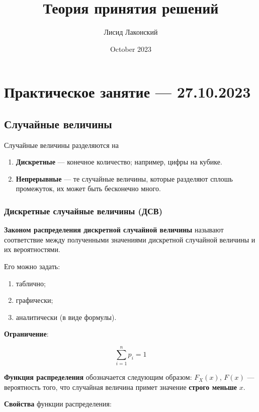 \documentclass{article}
\title{Теория принятия решений}
\author{Лисид Лаконский}
\date{October 2023}
\begin{document}
\raggedright

\maketitle

\tableofcontents
\pagebreak

\section{Практическое занятие — 27.10.2023}

\subsection{Случайные величины}

Случайные величины разделяются на

\begin{enumerate}
    \item \textbf{Дискретные} — конечное количество; например, цифры на кубике.
    \item \textbf{Непрерывные} — те случайные величины, которые разделяют сплошь промежуток, их может быть бесконечно много.
\end{enumerate}

\subsubsection{Дискретные случайные величины (ДСВ)}

\textbf{Законом распределения дискретной случайной величины} называют соответствие между полученными значениями дискретной случайной величины и их вероятностями.

Его можно задать:

\begin{enumerate}
    \item таблично;
    \item графически;
    \item аналитически (в виде формулы).
\end{enumerate}

\textbf{Ограничение}:

$$
\sum\limits_{i = 1}^{n} p_{i} = 1
$$

\textbf{Функция распределения} обозначается следующим образом: $F_{X}(x)$, $F(x)$ — вероятность того, что случайная величина примет значение \textbf{строго меньше} $x$.

\textbf{Свойства} функции распределения:
\end{document}
